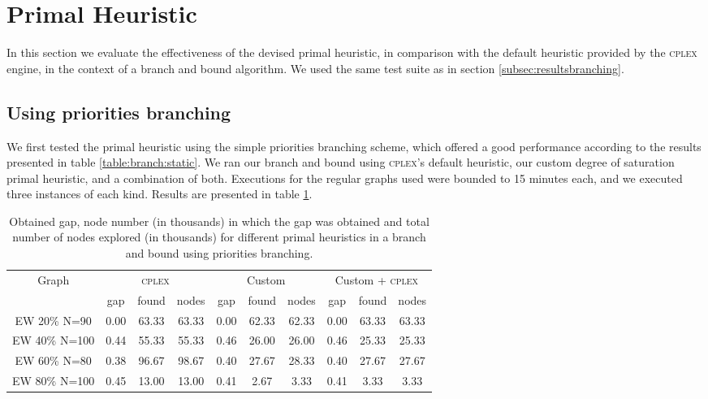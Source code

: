 
\section{Primal Heuristic}
\label{subsec:resultsprimal}

In this section we evaluate the effectiveness of the devised primal heuristic, in comparison with the default heuristic provided by the \textsc{cplex} engine, in the context of a branch and bound algorithm. We used the same test suite as in section \ref{subsec:resultsbranching}.

\subsection{Using priorities branching}

We first tested the primal heuristic using the simple priorities branching scheme, which offered a good performance according to the results presented in table \ref{table:branch:static}. We ran our branch and bound using \textsc{cplex}'s default heuristic, our custom degree of saturation primal heuristic, and a combination of both. Executions for the regular graphs used were bounded to 15 minutes each, and we executed three instances of each kind. Results are presented in table \ref{table:primal:prios}.

\begin{table}[h]
\centering

\begin{tabular}{|c|ccc|ccc|ccc|}
\hline
\multicolumn{1}{|c|}{Graph} & \multicolumn{3}{|c|}{\textsc{cplex}} & \multicolumn{3}{|c|}{Custom} & \multicolumn{3}{|c|}{Custom + \textsc{cplex}}
\\
 & gap & found & nodes & gap & found & nodes & gap & found & nodes
\\
\hline
EW 20\% N=90 & 0.00 & 63.33 & 63.33 & 0.00 & 62.33 & 62.33 & 0.00 & 63.33 & 63.33
\\
EW 40\% N=100 & 0.44 & 55.33 & 55.33 & 0.46 & 26.00 & 26.00 & 0.46 & 25.33 & 25.33
\\
EW 60\% N=80 & 0.38 & 96.67 & 98.67 & 0.40 & 27.67 & 28.33 & 0.40 & 27.67 & 27.67
\\
EW 80\% N=100 & 0.45 & 13.00 & 13.00 & 0.41 & 2.67 & 3.33 & 0.41 & 3.33 & 3.33
\\
\hline 
 \end{tabular}
 
\caption{Obtained gap, node number (in thousands) in which the gap was obtained and total number of nodes explored (in thousands) for different primal heuristics in a branch and bound using priorities branching.}
\label{table:primal:prios}

\end{table}


